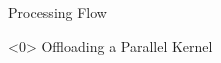 \documentclass[10pt,t]{beamer}
\begin{document}

\begin{frame}{Processing Flow}
\end{frame}

\begin{frame}<0>{ Offloading a Parallel Kernel}
  
\end{frame}
\end{document}
